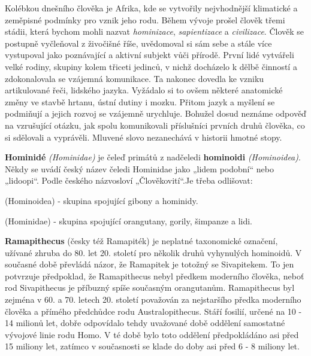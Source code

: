         Kolébkou dnešního člověka je Afrika, kde se vytvořily nejvhodnější klimatické a zeměpisné
        podmínky pro vznik jeho rodu. Během vývoje prošel člověk třemi stádii, která bychom mohli
        nazvat \emph{hominizace}, \emph{sapientizace} a \emph{civilizace}. Člověk se postupně
        vyčleňoval z živočišné říše, uvědomoval si sám sebe a stále více vystupoval jako poznávající
        a aktivní subjekt vůči přírodě. První lidé vytvářeli velké rodiny, skupiny kolem třiceti
        jedinců, v nichž docházelo k dělbě činností a zdokonalovala se vzájemná komunikace. Ta
        nakonec dovedla ke vzniku artikulované řeči, lidského jazyka. Vyžádalo si to ovšem některé
        anatomické změny ve stavbě hrtanu, ústní dutiny i mozku. Přitom jazyk a myšlení se podmiňují
        a jejich rozvoj se vzájemně urychluje. Bohužel dosud neznáme odpověď na vzrušující otázku,
        jak spolu komunikovali příslušníci prvních druhů člověka, co si sdělovali a vyprávěli.
        Mluvené slovo nezanechává v historii hmotné stopy.

        \begin{tcnote}
          \textbf{Hominidé} \emph{(Hominidae)} je čeleď primátů z nadčeledi \textbf{hominoidi}
          \emph{(Hominoidea)}. Někdy se uvádí český název čeledi Hominidae jako „lidem podobní“ nebo
          „lidoopi“. Podle českého názvosloví „Člověkovití“.Je třeba odlišovat:
          \begin{description}[leftmargin=8em,labelindent=1em, style=nextline]
            \item[\textbf{Hominoidi}] (Hominoidea) - skupina spojující gibony a hominidy.
            \item[\textbf{Hominidé}] (Hominidae) - skupina spojující orangutany, gorily, šimpanze a
              lidi.
          \end{description}

          \noindent\textbf{Ramapithecus} (česky též Ramapiték) je neplatné taxonomické označení,
          užívané zhruba do 80. let 20. století pro několik druhů vyhynulých hominoidů. V současné
          době převládá názor, že Ramapitek je totožný se Sivapitekem. To jen potvrzuje předpoklad,
          že Ramapithecus nebyl předkem moderního člověka, neboť rod Sivapithecus je příbuzný spíše
          současným orangutanům. Ramapithecus byl zejména v 60. a 70. letech 20. století považován
          za nejstaršího předka moderního člověka a přímého předchůdce rodu Australopithecus. Stáří
          fosilií, určené na 10 - 14 milionů let, dobře odpovídalo tehdy uvažované době oddělení
          samostatné vývojové linie rodu Homo. V té době bylo toto oddělení předpokládáno asi před
          15 miliony let, zatímco v současnosti se klade do doby asi před 6 - 8 miliony let.
        \end{tcnote}

